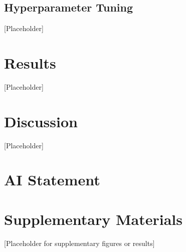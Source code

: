 \documentclass[conference]{IEEEtran}
\begin{document}
\subsection{Hyperparameter Tuning}
[Placeholder]

\section{Results}
[Placeholder]


\section{Discussion}
[Placeholder]

\section*{AI Statement}


\section*{Supplementary Materials}
[Placeholder for supplementary figures or results]

\clearpage
\onecolumn
\end{document}

